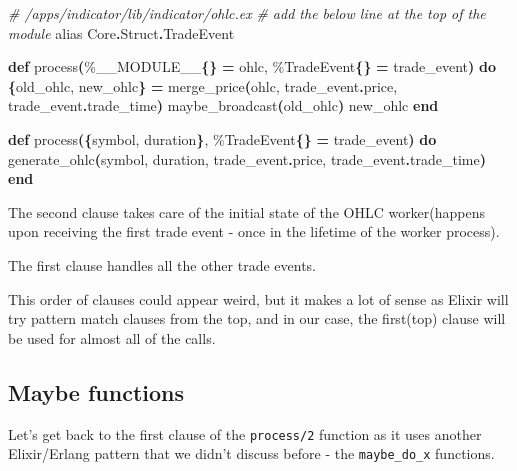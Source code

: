 \documentclass[
  oneside]{book}
\newenvironment{Shaded}{\begin{snugshade}}{\end{snugshade}}
\newcommand{\CommentTok}[1]{\textcolor[rgb]{0.56,0.35,0.01}{\textit{#1}}}
\newcommand{\ConstantTok}[1]{\textcolor[rgb]{0.56,0.35,0.01}{#1}}
\newcommand{\FunctionTok}[1]{\textcolor[rgb]{0.13,0.29,0.53}{\textbf{#1}}}
\newcommand{\ImportTok}[1]{#1}
\newcommand{\KeywordTok}[1]{\textcolor[rgb]{0.13,0.29,0.53}{\textbf{#1}}}
\newcommand{\NormalTok}[1]{#1}
\newcommand{\OperatorTok}[1]{\textcolor[rgb]{0.81,0.36,0.00}{\textbf{#1}}}
\begin{document}
\begin{Shaded}
\begin{Highlighting}[]
\CommentTok{\# /apps/indicator/lib/indicator/ohlc.ex}
  \CommentTok{\# add the below line at the top of the module}
  \ImportTok{alias} \ConstantTok{Core}\OperatorTok{.}\ConstantTok{Struct}\OperatorTok{.}\ConstantTok{TradeEvent}

  \KeywordTok{def}\NormalTok{ process}\FunctionTok{(}\NormalTok{\%}\ConstantTok{\_\_MODULE\_\_}\FunctionTok{\{\}} \OperatorTok{=}\NormalTok{ ohlc, \%}\ConstantTok{TradeEvent}\FunctionTok{\{\}} \OperatorTok{=}\NormalTok{ trade\_event}\FunctionTok{)} \KeywordTok{do}
    \FunctionTok{\{}\NormalTok{old\_ohlc, new\_ohlc}\FunctionTok{\}} \OperatorTok{=}\NormalTok{ merge\_price}\FunctionTok{(}\NormalTok{ohlc, trade\_event}\OperatorTok{.}\NormalTok{price, trade\_event}\OperatorTok{.}\NormalTok{trade\_time}\FunctionTok{)}
\NormalTok{    maybe\_broadcast}\FunctionTok{(}\NormalTok{old\_ohlc}\FunctionTok{)}
\NormalTok{    new\_ohlc}
  \KeywordTok{end}

  \KeywordTok{def}\NormalTok{ process}\FunctionTok{(\{}\NormalTok{symbol, duration}\FunctionTok{\}}\NormalTok{, \%}\ConstantTok{TradeEvent}\FunctionTok{\{\}} \OperatorTok{=}\NormalTok{ trade\_event}\FunctionTok{)} \KeywordTok{do}
\NormalTok{    generate\_ohlc}\FunctionTok{(}\NormalTok{symbol, duration, trade\_event}\OperatorTok{.}\NormalTok{price, trade\_event}\OperatorTok{.}\NormalTok{trade\_time}\FunctionTok{)}
  \KeywordTok{end}
\end{Highlighting}
\end{Shaded}

The second clause takes care of the initial state of the OHLC worker(happens upon receiving the first trade event - once in the lifetime of the worker process).

The first clause handles all the other trade events.

This order of clauses could appear weird, but it makes a lot of sense as Elixir will try pattern match clauses from the top, and in our case, the first(top) clause will be used for almost all of the calls.

\subsection{Maybe functions}\label{maybe-functions}

Let's get back to the first clause of the \texttt{process/2} function as it uses another Elixir/Erlang pattern that we didn't discuss before - the \texttt{maybe\_do\_x} functions.
\end{document}

